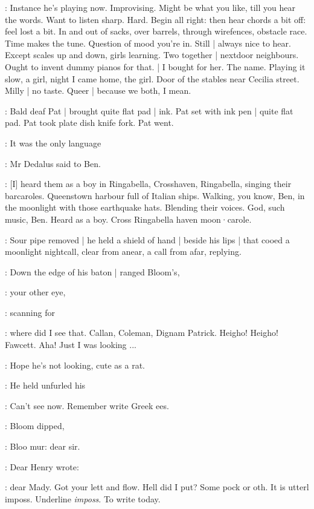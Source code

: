 \BloomInt:
Instance he's playing now.
Improvising.
Might be what you like,
till you hear the words.
Want to listen sharp.
Hard.
Begin all right:
then hear chords a bit off:
feel lost a bit.
In and out of sacks,
over barrels,
through wirefences,
obstacle race.
Time makes the tune.
Question of mood you're in.
Still |
always nice to hear.
Except scales up and down,
girls learning.
Two together |
nextdoor neighbours.
Ought to invent dummy pianos for that.
 |
I bought for her.
The name.
Playing it slow,
a girl,
night I came home,
the girl.
Door of the stables near Cecilia street.
Milly |
no taste.
Queer |
because we both,
I mean.

:
Bald deaf Pat |
brought quite flat pad |
ink.
Pat set with ink pen |
quite flat pad.
Pat took plate dish knife fork.
Pat went.

\simon:
It was the only language

:
Mr Dedalus said to Ben.

\simon:
[I] heard them as a boy in Ringabella,
Crosshaven,
Ringabella,
singing their barcaroles.
Queenstown harbour full of Italian ships.
Walking,
you know,
Ben,
in the moonlight with those earthquake hats.
Blending their voices.
God,
such music,
Ben.
Heard as a boy.
Cross Ringabella haven moon·carole.

:
Sour pipe removed |
he held a shield of hand |
beside his lips |
that cooed a moonlight nightcall,
clear from anear,
a call from afar,
replying.

:
Down the edge of his  baton |
ranged Bloom's,

:
your other eye,

:
scanning for

\BloomInt:
where did I see that.
Callan,
Coleman,
Dignam Patrick.
Heigho!
Heigho!
Fawcett.
Aha!
Just I was looking ...

\BloomInt:
Hope he's not looking,
cute as a rat.

:
He held unfurled his 

\BloomInt:
Can't see now.
Remember write Greek ees.

:
Bloom dipped,

\BloomInt:
Bloo mur:
dear sir.

:
Dear Henry wrote:

\BloomInt:
dear Mady.
Got your lett and flow.
Hell did I put?
Some pock or oth.
It is utterl imposs.
Underline \emph{imposs}.
To write today.

